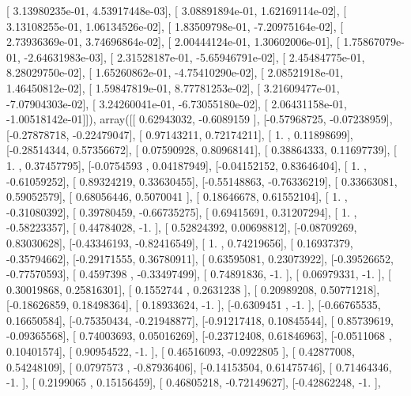 \documentclass{article}
\begin{document}
       [  3.13980235e-01,   4.53917448e-03],
       [  3.08891894e-01,   1.62169114e-02],
       [  3.13108255e-01,   1.06134526e-02],
       [  1.83509798e-01,  -7.20975164e-02],
       [  2.73936369e-01,   3.74696864e-02],
       [  2.00444124e-01,   1.30602006e-01],
       [  1.75867079e-01,  -2.64631983e-03],
       [  2.31528187e-01,  -5.65946791e-02],
       [  2.45484775e-01,   8.28029750e-02],
       [  1.65260862e-01,  -4.75410290e-02],
       [  2.08521918e-01,   1.46450812e-02],
       [  1.59847819e-01,   8.77781253e-02],
       [  3.21609477e-01,  -7.07904303e-02],
       [  3.24260041e-01,  -6.73055180e-02],
       [  2.06431158e-01,  -1.00518142e-01]]), array([[ 0.62943032, -0.6089159 ],
       [-0.57968725, -0.07238959],
       [-0.27878718, -0.22479047],
       [ 0.97143211,  0.72174211],
       [ 1.        ,  0.11898699],
       [-0.28514344,  0.57356672],
       [ 0.07590928,  0.80968141],
       [ 0.38864333,  0.11697739],
       [ 1.        ,  0.37457795],
       [-0.0754593 ,  0.04187949],
       [-0.04152152,  0.83646404],
       [ 1.        , -0.61059252],
       [ 0.89324219,  0.33630455],
       [-0.55148863, -0.76336219],
       [ 0.33663081,  0.59052579],
       [ 0.68056446,  0.5070041 ],
       [ 0.18646678,  0.61552104],
       [ 1.        , -0.31080392],
       [ 0.39780459, -0.66735275],
       [ 0.69415691,  0.31207294],
       [ 1.        , -0.58223357],
       [ 0.44784028, -1.        ],
       [ 0.52824392,  0.00698812],
       [-0.08709269,  0.83030628],
       [-0.43346193, -0.82416549],
       [ 1.        ,  0.74219656],
       [ 0.16937379, -0.35794662],
       [-0.29171555,  0.36780911],
       [ 0.63595081,  0.23073922],
       [-0.39526652, -0.77570593],
       [ 0.4597398 , -0.33497499],
       [ 0.74891836, -1.        ],
       [ 0.06979331, -1.        ],
       [ 0.30019868,  0.25816301],
       [ 0.1552744 ,  0.2631238 ],
       [ 0.20989208,  0.50771218],
       [-0.18626859,  0.18498364],
       [ 0.18933624, -1.        ],
       [-0.6309451 , -1.        ],
       [-0.66765535,  0.16650584],
       [-0.75350434, -0.21948877],
       [-0.91217418,  0.10845544],
       [ 0.85739619, -0.09365568],
       [ 0.74003693,  0.05016269],
       [-0.23712408,  0.61846963],
       [-0.0511068 ,  0.10401574],
       [ 0.90954522, -1.        ],
       [ 0.46516093, -0.0922805 ],
       [ 0.42877008,  0.54248109],
       [ 0.0797573 , -0.87936406],
       [-0.14153504,  0.61475746],
       [ 0.71464346, -1.        ],
       [ 0.2199065 ,  0.15156459],
       [ 0.46805218, -0.72149627],
       [-0.42862248, -1.        ],
\end{document}
